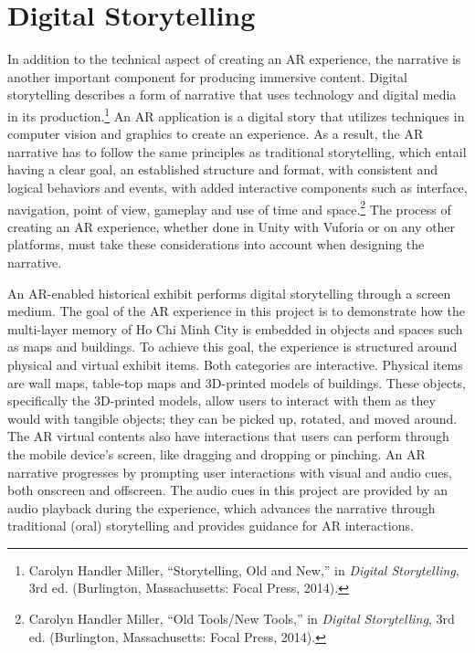 \section{Digital Storytelling}
In addition to the technical aspect of creating an AR experience, the narrative is another important component for producing immersive content. Digital storytelling describes a form of narrative that uses technology and digital media in its production.\footnote{Carolyn Handler Miller, “Storytelling, Old and New,” in \textit{Digital Storytelling}, 3rd ed. (Burlington, Massachusetts: Focal Press, 2014).} An AR application is a digital story that utilizes techniques in computer vision and graphics to create an experience. As a result, the AR narrative has to follow the same principles as traditional storytelling, which entail having a clear goal, an established structure and format, with consistent and logical behaviors and events, with added interactive components such as interface, navigation, point of view, gameplay and use of time and space.\footnote{Carolyn Handler Miller, “Old Tools/New Tools,” in \textit{Digital Storytelling}, 3rd ed. (Burlington, Massachusetts: Focal Press, 2014).} The process of creating an AR experience, whether done in Unity with Vuforia or on any other platforms, must take these considerations into account when designing the narrative.

An AR-enabled historical exhibit performs digital storytelling through a screen medium. The goal of the AR experience in this project is to demonstrate how the multi-layer memory of Ho Chi Minh City is embedded in objects and spaces such as maps and buildings. To achieve this goal, the experience is structured around physical and virtual exhibit items. Both categories are interactive. Physical items are wall maps, table-top maps and 3D-printed models of buildings. These objects, specifically the 3D-printed models, allow users to interact with them as they would with tangible objects; they can be picked up, rotated, and moved around. The AR virtual contents also have interactions that users can perform through the mobile device's screen, like dragging and dropping or pinching. An AR narrative progresses by prompting user interactions with visual and audio cues, both onscreen and offscreen. The audio cues in this project are provided by an audio playback during the experience, which advances the narrative through traditional (oral) storytelling and provides guidance for AR interactions. 

